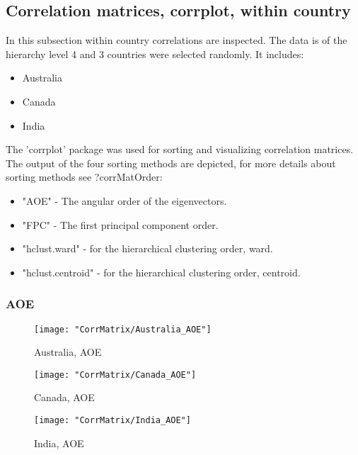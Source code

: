 \documentclass[a4paper]{article}
\begin{document}
\subsection{Correlation matrices, corrplot, within country}
In this subsection within country correlations are inspected. The data
is of the hierarchy level 4 and 3 countries were selected randomly. It
includes:

\begin{itemize}
\item Australia
\item Canada
\item India
\end{itemize}

The 'corrplot' package was used for sorting and visualizing
correlation matrices. The output of the four sorting methods are
depicted, for more details about sorting methods see ?corrMatOrder:

\begin{itemize}
\item "AOE" -  The angular order of the eigenvectors.
\item "FPC" - The first principal component order.
\item "hclust.ward" - for the hierarchical clustering order, ward.
\item "hclust.centroid" - for the hierarchical clustering order, centroid.
\end{itemize}

\subsubsection{AOE}

\begin{figure}[H]
\begin{center}
\texttt{[image: "CorrMatrix/Australia\_AOE"]}
\caption{Australia,  AOE}
\label{fig:2}
\end{center}
\end{figure}

\begin{figure}[H]
\begin{center}
\texttt{[image: "CorrMatrix/Canada\_AOE"]}
\caption{Canada,  AOE}
\label{fig:2}
\end{center}
\end{figure}

\begin{figure}[H]
\begin{center}
\texttt{[image: "CorrMatrix/India\_AOE"]}
\caption{India,  AOE}
\label{fig:2}
\end{center}
\end{figure}
\end{document}
